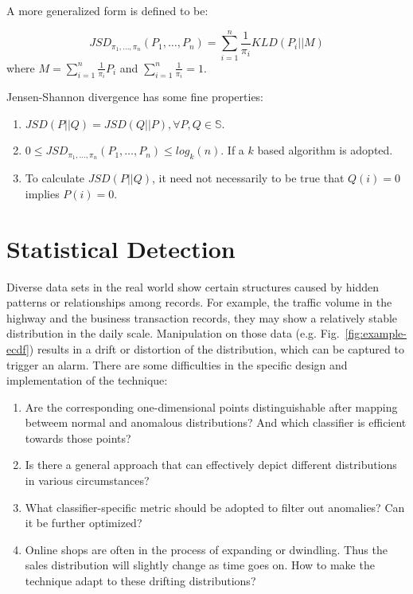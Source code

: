 \documentclass[10pt,conference,letterpaper]{IEEEtran}
\begin{document}
			A more generalized form is defined to be:
			
			\begin{equation}
				JSD_{\pi_1, \dots, \pi_n}(P_1, \dots, P_n) = \sum_{i=1}^{n}\frac{1}{\pi_i}KLD(P_i||M)
			\end{equation}
			where $\displaystyle M = \sum_{i=1}^{n}\frac{1}{\pi_i}P_i$ and $\displaystyle \sum_{i=1}^{n}\frac{1}{\pi_i} = 1$.
	
			Jensen-Shannon divergence has some fine properties:
			\begin{enumerate}
				\item $JSD(P||Q) = JSD(Q||P), \forall P, Q\in \mathbb{S}$.
				\item $0 \le JSD_{\pi_1, \dots, \pi_n}(P_1, \dots, P_n) \le log_k(n)$. If a $k$ based algorithm is adopted.
				\item To calculate $JSD(P||Q)$, it need not necessarily to be true that $Q(i)=0$ implies $P(i)=0$.
			\end{enumerate}
	
	\section{Statistical Detection}\label{sec:algorithm-details}
		Diverse data sets in the real world show certain structures caused by hidden patterns or relationships among records. For example, the traffic volume in the highway and the business transaction records, they may show a relatively stable distribution in the daily scale. Manipulation on those data (e.g. Fig.~\ref{fig:example-ecdf}) results in a drift or distortion of the distribution, which can be captured to trigger an alarm. There are some difficulties in the specific design and implementation of the technique:
	
		\begin{enumerate}
			\item Are the corresponding one-dimensional points distinguishable after mapping betweem normal and anomalous distributions? And which classifier is efficient towards those points?
			\item Is there a general approach that can effectively depict different distributions in various circumstances?
			\item What classifier-specific metric should be adopted to filter out anomalies? Can it be further optimized?
			\item Online shops are often in the process of expanding or dwindling. Thus the sales distribution will slightly change as time goes on. How to make the technique adapt to these drifting distributions?
		\end{enumerate}
	
\end{document}
